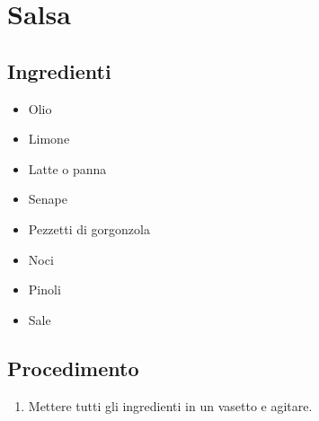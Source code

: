 \section{Salsa }
\subsection{Ingredienti}
\begin{itemize}
\item Olio  
\item Limone  
\item Latte o panna  
\item Senape  
\item Pezzetti di gorgonzola  
\item Noci  
\item Pinoli  
\item Sale
\end{itemize}
\subsection{Procedimento}
\begin{enumerate}
\item  Mettere tutti gli ingredienti in un vasetto e agitare.
\end{enumerate}
